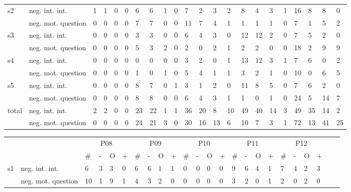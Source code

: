 \begin{table*}[h]
\begin{small}
\begin{tabular*}{\hsize}{@{\extracolsep{\fill}}llllllllllllllllllllll}
      \multirow{2}{*}{s2} & neg. int. int. & 1 & 1 & 0 & 0 & 6 & 6 & 1 & 0 & 7 & 2 & 3 & 2 & 8 & 4 & 3 & 1 & 16 & 8 & 8 & 0\\
      & neg. mot. question & 0 & 0 & 0 & 0 & 7 & 7 & 0 & 0 & 11 & 7 & 4 & 1 & 1 & 1 & 1 & 0 & 7 & 1 & 5 & 2\\
      \multirow{2}{*}{s3} & neg. int. int. & 0 & 0 & 0 & 0 & 3 & 3 & 0 & 0 & 6 & 4 & 3 & 0 & 12 & 12 & 2 & 0 & 7 & 5 & 2 & 0\\
      & neg. mot. question & 0 & 0 & 0 & 0 & 5 & 3 & 2 & 0 & 2 & 0 & 2 & 1 & 2 & 2 & 0 & 0 & 18 & 2 & 9 & 9\\
      \multirow{2}{*}{s4} & neg. int. int. & 0 & 0 & 0 & 0 & 0 & 0 & 0 & 0 & 3 & 2 & 0 & 1 & 13 & 12 & 3 & 1 & 7 & 6 & 0 & 2\\
      & neg. mot. question & 0 & 0 & 0 & 0 & 1 & 0 & 1 & 0 & 5 & 4 & 1 & 1 & 3 & 2 & 1 & 0 & 10 & 0 & 6 & 5\\
      \multirow{2}{*}{s5} & neg. int. int. & 0 & 0 & 0 & 0 & 8 & 7 & 0 & 1 & 3 & 1 & 2 & 0 & 11 & 8 & 5 & 0 & 7 & 6 & 2 & 0\\
      & neg. mot. question & 0 & 0 & 0 & 0 & 8 & 8 & 0 & 0 & 6 & 4 & 3 & 1 & 1 & 0 & 1 & 0 & 24 & 5 & 14 & 7\\
      \multirow{2}{*}{total} & neg. int. int. & 2 & 2 & 0 & 0 & 23 & 22 & 1 & 1 & 36 & 20 & 8 & 10 & 49 & 40 & 14 & 3 & 49 & 35 & 14 & 2\\
      & neg. mot. question & 0 & 0 & 0 & 0 & 24 & 21 & 3 & 0 & 30 & 16 & 13 & 6 & 10 & 7 & 3 & 1 & 72 & 13 & 41 & 25\\
    \end{tabular*}
    \setlength{\tabcolsep}{1.12ex}
    \begin{tabular*}{\hsize}{@{\extracolsep{\fill}}llllllllllllllllllllllll}
      \toprule
      &  & \multicolumn{4}{c}{P08} & \multicolumn{4}{c}{P09} & \multicolumn{4}{c}{P10} & \multicolumn{4}{c}{P11} & \multicolumn{4}{c}{P12}\\
      \cmidrule(lr){3-6}\cmidrule(lr){7-10}\cmidrule(lr){11-14}\cmidrule(lr){15-18}\cmidrule(lr){19-22}
      &  & \# & - & O & + & \# & - & O & + & \# & - & O & + & \# & - & O & + & \# & - & O & + &\\
      \cmidrule(lr){3-6}\cmidrule(lr){7-10}\cmidrule(lr){11-14}\cmidrule(lr){15-18}\cmidrule(lr){19-22}
      \multirow{2}{*}{s1} & neg. int. int. & 6 & 3 & 3 & 0 & 6 & 6 & 1 & 1 & 0 & 0 & 0 & 0 & 9 & 6 & 4 & 1 & 7 & 4 & 2 & 3\\
      & neg. mot. question & 10 & 1 & 9 & 1 & 4 & 3 & 2 & 0 & 0 & 0 & 0 & 0 & 3 & 2 & 0 & 1 & 2 & 0 & 2 & 0\\

\end{tabular*}
\end{small}
\end{table*}
